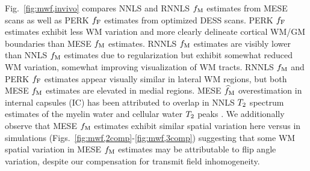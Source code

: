 Fig.~\ref{fig:mwf,invivo} compares 
NNLS and RNNLS $f_\mathrm{M}$ estimates from MESE scans
as well as PERK $f_{\mathrm{F}}$ estimates from optimized DESS scans.
PERK $f_{\mathrm{F}}$ estimates exhibit less WM variation
and more clearly delineate cortical WM/GM boundaries
than MESE $f_\mathrm{M}$ estimates.
RNNLS $f_\mathrm{M}$ estimates are visibly lower than NNLS $f_\mathrm{M}$ estimates
due to regularization
but exhibit somewhat reduced WM variation,
somewhat improving visualization of WM tracts. 
RNNLS $f_\mathrm{M}$ and PERK $f_{\mathrm{F}}$ estimates 
appear visually similar in lateral WM regions,
but both MESE $f_\mathrm{M}$ estimates are elevated in medial regions.
MESE $\widehat{f}_\mathrm{M}$ overestimation in internal capsules (IC)
has been attributed 
to overlap in NNLS $T_2$ spectrum estimates 
of the myelin water and cellular water $T_2$ peaks \cite{zhang:15:com}.
We additionally observe
that MESE $f_\mathrm{M}$ estimates exhibit similar spatial variation
here versus in simulations 
(\cf Figs.~\ref{fig:mwf,2comp}-\ref{fig:mwf,3comp})
suggesting that some WM spatial variation
in MESE $f_\mathrm{M}$ estimates
may be attributable to flip angle variation,
despite our compensation for transmit field inhomogeneity.

